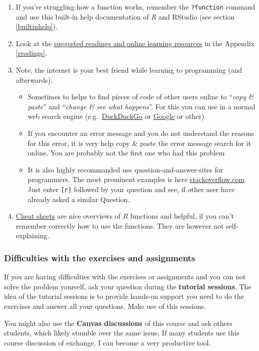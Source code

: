\documentclass[
]{scrartcl}
\makeatletter
\newenvironment{kframe}{%
\medskip{}
\setlength{\fboxsep}{.8em}
 \def\at@end@of@kframe{}%
 \ifinner\ifhmode%
  \def\at@end@of@kframe{\end{minipage}}%
  \begin{minipage}{\columnwidth}%
 \fi\fi%
 \def\FrameCommand##1{\hskip\@totalleftmargin \hskip-\fboxsep
 \colorbox{shadecolor}{##1}\hskip-\fboxsep
     \hskip-\linewidth \hskip-\@totalleftmargin \hskip\columnwidth}%
 \MakeFramed {\advance\hsize-\width
   \@totalleftmargin\z@ \linewidth\hsize
   \@setminipage}}%
 {\par\unskip\endMakeFramed%
 \at@end@of@kframe}
\newenvironment{rmdblock}[1]
  {
  \begin{itemize}
  \renewcommand{\labelitemi}{
    \raisebox{-.7\height}[0pt][0pt]{
      {\setkeys{Gin}{width=3em,keepaspectratio}\texttt{[image: images/\#1]}}
    }
  }
  \setlength{\fboxsep}{1em}
  \begin{kframe}
  \item
  }
  {
  \end{kframe}
  \end{itemize}
  }
\newenvironment{important}
    {\begin{rmdblock}{hint}}
    {\end{rmdblock}}
\makeatother
\begin{document}
\begin{enumerate}
\def\labelenumi{\arabic{enumi}.}
\item
  If you're struggling how a function works, remember the \texttt{?function} command and use this built-in help documentation of \emph{R} and RStudio (see section \ref{builtinhelp}).
\item
  Look at the \hyperref[readings]{suggested readings and online learning resources} in the Appendix \ref{readings}.
\item
  Note, the internet is your best friend while learning to programming (and afterwards).

  \begin{itemize}
  \item
    Sometimes to helps to find pieces of code of other users online to ``\emph{copy \& paste}'' and ``\emph{change \& see what happens}''. For this you can use in a normal web search engine (e.g.~\href{https://duckduckgo.com/}{DuckDuckGo} or \href{http://www.google.com/en}{Google} or other).
  \item
    If you encounter an error message and you do not understand the reasons for this error, it is very help copy \& paste the error message search for it online. You are probably not the first one who had this problem
  \item
    It is also highly recommanded use question-and-answer-sites for programmers. The most prominent examples is here \href{https://stackoverflow.com/questions/tagged/r}{stackoverflow.com}. Just enter \texttt{{[}r{]}} followed by your question and see, if other user have already asked a similar Question.
  \end{itemize}
\item
  \hyperref[cheatsheets]{Cheat sheets} are nice overviews of \emph{R} functions and helpful, if you can't remember correctly how to use the functions. They are however not self-explaining.
\end{enumerate}

\begin{important}
\subsubsection*{Difficulties with the exercises and
assignments}\label{difficulties-with-the-exercises-and-assignments}

If you are having difficulties with the exercises or assignments and you
can not solve the problem yourself, ask your question during the
\textbf{tutorial sessions}. The idea of the tutorial sessions is to
provide hands-on support you need to do the exercises and answer all
your questions. Make use of this sessions.

You might also use the \textbf{Canvas discussions} of this course and
ask others students, which likely stumble over the same issue. If many
students use this course discussion of exchange, I can become a very
productive tool.
\end{important}
\end{document}
